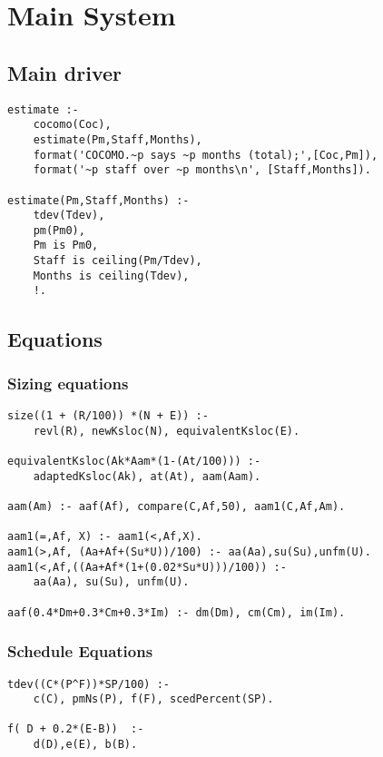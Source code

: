 \section{Main System
}
\subsection{ Main driver }\begin{Verbatim}
estimate :-
	cocomo(Coc),
	estimate(Pm,Staff,Months),
	format('COCOMO.~p says ~p months (total);',[Coc,Pm]),
	format('~p staff over ~p months\n', [Staff,Months]).

estimate(Pm,Staff,Months) :-
	tdev(Tdev),
	pm(Pm0),
	Pm is Pm0,
	Staff is ceiling(Pm/Tdev),
	Months is ceiling(Tdev),
	!.
\end{Verbatim}
\subsection{ Equations
}
\subsubsection{ Sizing equations }\begin{Verbatim}
size((1 + (R/100)) *(N + E)) :- 
	revl(R), newKsloc(N), equivalentKsloc(E).

equivalentKsloc(Ak*Aam*(1-(At/100))) :- 
	adaptedKsloc(Ak), at(At), aam(Aam).

aam(Am) :- aaf(Af), compare(C,Af,50), aam1(C,Af,Am).

aam1(=,Af, X) :- aam1(<,Af,X).
aam1(>,Af, (Aa+Af+(Su*U))/100) :- aa(Aa),su(Su),unfm(U).
aam1(<,Af,((Aa+Af*(1+(0.02*Su*U)))/100)) :-
	aa(Aa), su(Su), unfm(U).

aaf(0.4*Dm+0.3*Cm+0.3*Im) :- dm(Dm), cm(Cm), im(Im).
\end{Verbatim}
\subsubsection{ Schedule Equations }\begin{Verbatim}
tdev((C*(P^F))*SP/100) :-
	c(C), pmNs(P), f(F), scedPercent(SP).

f( D + 0.2*(E-B))  :-
	d(D),e(E), b(B).
\end{Verbatim}
